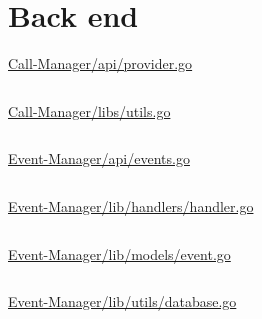 \section{Back end}

\underline{Call-Manager/api/provider.go}

\inputminted[linenos, bgcolor=lightestgray, breaklines, breakanywhere]{jsx}{../Call-Manager/api/provider.go}

\underline{Call-Manager/libs/utils.go}

\inputminted[linenos, bgcolor=lightestgray, breaklines, breakanywhere]{jsx}{../Call-Manager/libs/utils.go}

\underline{Event-Manager/api/events.go}

\inputminted[linenos, bgcolor=lightestgray, breaklines, breakanywhere]{jsx}{../Event-Manager/api/events.go}

\underline{Event-Manager/lib/handlers/handler.go}

\inputminted[linenos, bgcolor=lightestgray, breaklines, breakanywhere]{jsx}{../Event-Manager/lib/handlers/handler.go}

\underline{Event-Manager/lib/models/event.go}

\inputminted[linenos, bgcolor=lightestgray, breaklines, breakanywhere]{jsx}{../Event-Manager/lib/models/event.go}

\underline{Event-Manager/lib/utils/database.go}

\inputminted[linenos, bgcolor=lightestgray, breaklines, breakanywhere]{jsx}{../Event-Manager/lib/utils/database.go}
